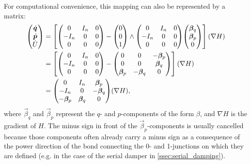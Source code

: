 For computational convenience, this mapping can also be represented by a matrix: 
\begin{equation}
    \begin{split}
        \mqty(\dot{\vec{q}} \\ \dot{\vec{p}} \\ \dot{U}) 
              &= \qty[\mqty( 0 & I_n & 0 \\  -I_n & 0 & 0 \\ 0 & 0 & 0) 
                - \mqty(0 \\ 0 \\ 1) \wedge \mqty( 0 & I_n & 0 \\  -I_n & 0 & 0 \\ 0 & 0 & 0) \mqty(\vec{\beta}_{q} \\ \vec{\beta}_{p}\\0)](\nabla H) \\
              &= \qty[\mqty( 0 & I_n & 0 \\  -I_n & 0 & 0 \\ 0 & 0 & 0) 
                 - \mqty(0 & 0 & -\vec{\beta}_p \\ 0 & 0 & \vec{\beta}_q \\ \vec{\beta}_p &  -\vec{\beta}_q & 0 )](\nabla H) \\
              &= \mqty( 0 & I_n & \vec{\beta}_p \\  -I_n & 0 & -\vec{\beta}_q \\ -\vec{\beta}_p & \vec{\beta}_q & 0)(\nabla H),
    \end{split}
    \label{eq:matrix_jacobi_mapping}
\end{equation}
where \(\vec{\beta}_q\) and \(\vec{\beta}_p\) represent the \(q\)- and \(p\)-components of the form \(\beta\), and \(\nabla H\) is the gradient of \(H\). The minus sign in front of the \(\vec{\beta}_p\)-components is usually cancelled because those components often already carry a minus sign as a consequence of the power direction of the bond connecting the 0- and 1-junctions on which they are defined (e.g. in the case of the serial damper in \cref{ssec:serial_damping}).

